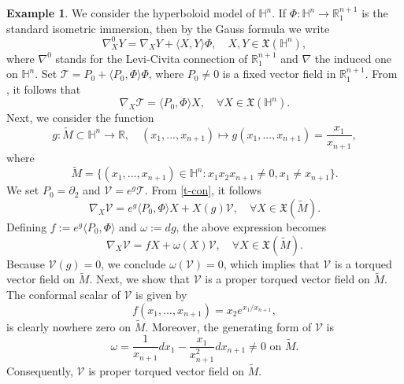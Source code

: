 \documentclass[12pt]{amsart}
\def\r{\mathbb R}
\def\h{\mathbb H}
\theoremstyle{definition}
\newtheorem{example}[theorem]{Example}
\begin{document}
\begin{example}\label{ex-torq}
We consider the hyperboloid model of $\h^n$. If $\Phi: \h^n \to \r^{n+1}_1$ is the standard isometric immersion, then by the Gauss formula we write
\begin{equation*}
\nabla^0_XY=\nabla_XY + \langle X,Y \rangle \Phi, \quad X,Y \in \mathfrak{X}(\h^n),
\end{equation*}
where $\nabla^0$ stands for the Levi-Civita connection of $\r^{n+1}_1$ and $\nabla$ the induced one on $\h^n$. Set $\mathcal{T} =P_0+\langle P_0 , \Phi \rangle \Phi $, where $P_0 \neq 0$ is a fixed vector field in $\r^{n+1}_1$. From \cite{loy1}, it follows that
\begin{equation}
\nabla_X\mathcal{T} =\langle P_0 , \Phi  \rangle X, \quad \forall X \in \mathfrak{X}(\h^n).    \label{t-con}
\end{equation}
Next, we consider the function 
\begin{equation*}
g:\widetilde{M} \subset \h^n \to \r, \quad (x_1,...,x_{n+1}) \mapsto g(x_1,...,x_{n+1})= \frac{x_1}{x_{n+1}},    
\end{equation*}
where 
\begin{equation*}
\widetilde{M}= \{(x_1,...,x_{n+1}) \in \h^n : x_1x_2x_{n+1}\neq 0, x_1 \neq x_{n+1} \}.    
\end{equation*}
We set $P_0= \partial_2 $ and $ \mathcal{V}=e^g\mathcal{T}.$ From \eqref{t-con}, it follows
\begin{equation*}
\nabla_X\mathcal{V}=e^g\langle P_0 , \Phi \rangle X +X(g)\mathcal{V}, \quad \forall X \in \mathfrak{X}(\widetilde{M}).    
\end{equation*}
Defining $f:=e^g\langle P_0 , \Phi \rangle$ and $\omega:=dg$, the above expression becomes
\begin{equation*}
\nabla_X\mathcal{V}=f X +\omega(X)\mathcal{V}, \quad \forall X \in \mathfrak{X}(\widetilde{M}).    
\end{equation*}
Because $\mathcal{V}(g)=0$, we conclude $\omega(\mathcal{V})=0$, which implies that $\mathcal{V}$ is a torqued vector field on $\widetilde{M}$. Next, we show that $\mathcal{V}$ is a proper torqued vector field on $\widetilde{M}$. The conformal scalar of $\mathcal{V}$ is given by
\begin{equation*}
f(x_1,...,x_{n+1})=x_2 e^{x_1/x_{n+1}},
\end{equation*}
is clearly nowhere zero on $\widetilde{M}$. Moreover, the generating form of $\mathcal{V}$ is
\begin{equation*}
\omega=\frac{1}{x_{n+1}}dx_1-\frac{x_1}{x^2_{n+1}}dx_{n+1} \neq 0 \text{ on } \widetilde{M}.
\end{equation*}
Consequently, $\mathcal{V}$ is proper torqued vector field on $\widetilde{M}$. 
\end{example}
\end{document}
